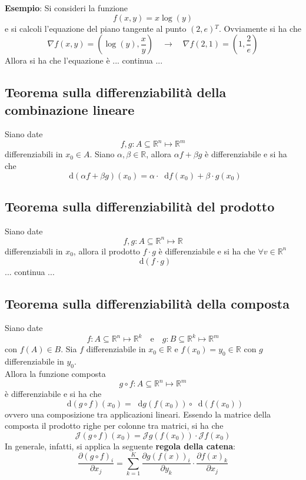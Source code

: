 \documentclass[a4paper]{extarticle}
\newcommand*\dif{\mathop{}\!\mathrm{d}}
\begin{document}
\vspace{1em}
\noindent
\textbf{Esempio}: Si consideri la funzione
\[f(x,y)=x \log(y)\]
e si calcoli l'equazione del piano tangente al punto $(2,e){^T}$. Ovviamente si ha che
\[\nabla f(x,y) = \left(\log(y),\frac{x}{y}\right) \hspace{1em} \rightarrow \hspace{1em} \nabla f(2,1) = \left(1,\frac{2}{e}\right)\]
Allora si ha che l'equazione è
... continua ...

\vspace{1em}
\noindent
\subsection{Teorema sulla differenziabilità della combinazione lineare}
Siano date
\[f,g : A \subseteq \mathbb{R}^n \longmapsto \mathbb{R}^m\]
differenziabili in $x_0 \in A$. Siano $\alpha, \beta \in \mathbb{R}$, allora $\alpha f + \beta g$ è differenziabile e si ha che
\[\dif \left(\alpha f + \beta g\right)(x_0) = \alpha \cdot \dif f(x_0) + \beta \cdot g(x_0)\]

\vspace{1em}
\noindent
\subsection{Teorema sulla differenziabilità del prodotto}
Siano date
\[f,g : A \subseteq \mathbb{R}^n \longmapsto \mathbb{R}\]
differenziabili in $x_0$, allora il prodotto $f \cdot g$ è differenziabile e si ha che $\forall v \in \mathbb{R}^n$
\[\dif (f \cdot g)\]
... continua ...

\vspace{1em}
\noindent
\subsection{Teorema sulla differenziabilità della composta}
Siano date
\[f : A \subseteq \mathbb{R}^n \longmapsto \mathbb{R}^k \hspace{1em} \text{e} \hspace{1em} g : B \subseteq \mathbb{R}^k \longmapsto \mathbb{R}^m\]
con $f(A) \in B$. Sia $f$ differenziabile in $x_0 \in \mathbb{R}$ e $f(x_0)=y_0 \in \mathbb{R}$ con $g$ differenziabile in $y_0$.\\
Allora la funzione composta
\[g \circ f : A \subseteq \mathbb{R}^n \longmapsto \mathbb{R}^m\]
è differenziabile e si ha che
\[\dif(g \circ f)(x_0) = \dif g(f(x_0)) \circ \dif(f(x_0))\]
ovvero una composizione tra applicazioni lineari. Essendo la matrice della composta il prodotto righe per colonne tra matrici, si ha che
\[\mathcal{J}(g \circ f)(x_0) = \mathcal{J}g(f(x_0)) \cdot \mathcal{J}f(x_0)\]
In generale, infatti, si applica la seguente \textbf{regola della catena}:
\[\frac{\partial (g \circ f)_i}{\partial x_j} = \sum_{k=1}^K \frac{\partial g(f(x))_i}{\partial y_k} \cdot \frac{\partial f(x)_k}{\partial x_j}\]
\end{document}
